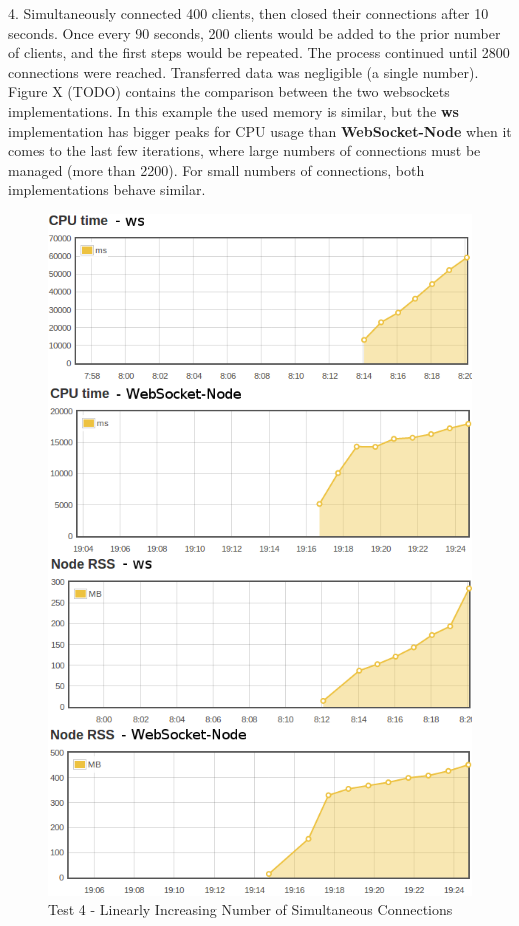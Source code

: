 \documentclass[conference]{IEEEtran}
\begin{document}
4. Simultaneously connected 400 clients, then closed their connections after 10
seconds. Once every 90 seconds, 200 clients would be added to the prior number
of clients, and the first steps would be repeated.
The process continued until 2800 connections
were reached. Transferred data was negligible (a single number). Figure X (TODO)
contains the comparison between the two websockets implementations. In this
example the used memory is similar, but the \textbf{ws} implementation has
bigger peaks for CPU usage than \textbf{WebSocket-Node} when it comes to the
last few iterations, where large numbers of connections must be managed
(more than 2200). For small numbers of connections, both implementations behave
similar.
\\
\begin{frame}{}
  \begin{figure}
    \centering
	\includegraphics[width=1\linewidth]{img/test3v2.png}
    \caption{Test 4 - Linearly Increasing Number of Simultaneous Connections}
  \end{figure}
\end{frame}
\end{document}
